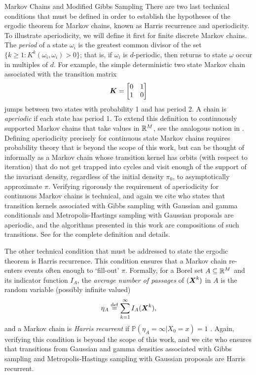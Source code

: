 \begin{chapter}{Markov Chains and Modified Gibbs Sampling}
There are two last technical conditions that must be defined in order to establish the hypotheses of the ergodic theorem for Markov chains, known as Harris recurrence and aperiodicity.
To illustrate aperiodicity, we will define it first for finite discrete Markov chains.
The \emph{period} of a state $\omega_i$ is the greatest common divisor of the set $\{k\ge 1: K^k(\omega_i,\omega_i) > 0\}$; that is, if $\omega_i$ is $d$-periodic, then returns to state $\omega$ occur in multiples of $d$.
For example, the simple deterministic two state Markov chain associated with the transition matrix
\begin{equation}
  \mbox{\boldmath$K$} = \begin{bmatrix}
    0 & 1\\
    1 & 0
  \end{bmatrix}
\end{equation}
jumps between two states with probability 1 and has period 2.
A chain is \emph{aperiodic} if each state has period 1. 
To extend this definition to continuously supported Markov chains that take values in $\mathbb R^M$, see the analogous notion in \citep[Chapter 6.3]{robert2013monte}.
Defining aperiodicity precisely for continuous state Markov chains requires probability theory that is beyond the scope of this work, but can be thought of informally as a Markov chain whose transition kernel has orbits (with respect to iteration) that do not get trapped into cycles and visit enough of the support of the invariant density, regardless of the initial density $\pi_0$, to asymptotically approximate $\pi$. 
Verifying rigorously the requirement of aperiodicity for continuous Markov chains is technical, and again we cite \citep{liu2008monte} who states that transition kernels associated with Gibbs sampling with Gaussian and gamma conditionals and Metropolis-Hastings sampling with Gaussian proposals are aperiodic, and the algorithms presented in this work are compositions of such transitions.
See \citep{robert2013monte} for the complete definition and details.

The other technical condition that must be addressed to state the ergodic theorem is Harris recurrence. 
This condition ensures that a Markov chain re-enters events often enough to `fill-out' $\pi$. 
Formally, for a Borel set $A\subseteq \mathbb R^M$ and its indicator function $I_A$, the \emph{average number of passages} of $(\mbox{\boldmath$X$}^k)$ in $A$ is the random variable (possibly infinite valued)
\begin{equation}
  \eta_A\stackrel{\rm def}{=} \sum_{k=1}^\infty I_A(\mbox{\boldmath$X$}^k),
\end{equation}
and a Markov chain is \emph{Harris recurrent} if $\mathbb P(\eta_A = \infty|X_0=x) =1$ \citep{robert2013monte}. 
Again, verifying this condition is beyond the scope of this work, and we cite \citep{liu2008monte} who ensures that transitions from Gaussian and gamma densities associated with Gibbs sampling and Metropolis-Hastings sampling with Gaussian proposals are Harris recurrent.


\end{chapter}
